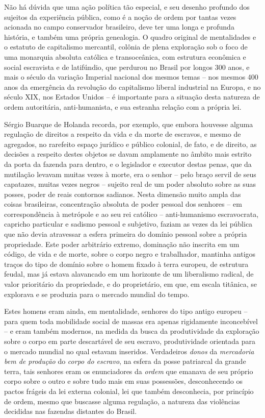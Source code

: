 Não há dúvida que uma ação política tão especial, e seu desenho profundo
dos sujeitos da experiência pública, como é a noção de ordem por tantas
vezes acionada no campo conservador brasileiro, deve ter uma longa e
profunda história, e também uma própria genealogia. O quadro original de
mentalidades e o estatuto de capitalismo mercantil, colônia de plena
exploração sob o foco de uma monarquia absoluta católica e
transoceânica, com estrutura econômica e social escravista e de
latifúndio, que perdurou no Brasil por longos 300 anos, e mais o século
da variação Imperial nacional dos mesmos temas -- nos mesmos 400 anos da
emergência da revolução do capitalismo liberal industrial na Europa, e
no século XIX, nos Estados Unidos -- é importante para a situação desta
natureza de ordem autoritária, anti-humanista, e sua estranha relação
com a própria lei.

Sérgio Buarque de Holanda recorda, por exemplo, que embora houvesse
alguma regulação de direitos a respeito da vida e da morte de escravos,
e mesmo de agregados, no rarefeito espaço jurídico e público colonial,
de fato, e de direito, as decisões a respeito destes objetos se davam
amplamente no âmbito mais estrito da porta da fazenda para dentro, e o
legislador e executor destas penas, que da mutilação levavam muitas
vezes à morte, era o senhor -- pelo braço servil de seus capatazes,
muitas vezes negros -- sujeito real de um poder absoluto sobre as suas
posses, poder de reais contornos sadianos. Nesta dimensão muito ampla
das coisas brasileiras, concentração absoluta de poder pessoal dos
senhores -- em correspondência à metrópole e ao seu rei católico --
anti-humanismo escravocrata, capricho particular e sadismo pessoal e
subjetivo, faziam as vezes da lei pública que não devia atravessar a
esfera primeira do domínio pessoal sobre a própria propriedade. Este
poder arbitrário extremo, dominação não inscrita em um código, de vida e
de morte, sobre o corpo negro e trabalhador, mantinha antigos traços do
tipo de domínio sobre o homem fixado à terra europeu, de estrutura
feudal, mas já estava alavancado em um horizonte de um liberalismo
radical, de valor prioritário da propriedade, e do proprietário, em que,
em escala titânica, se explorava e se produzia para o mercado mundial do
tempo.

Estes homens eram ainda, em mentalidade, senhores do tipo antigo europeu
-- para quem toda mobilidade social de massas era apenas rigidamente
inconcebível -- e eram também modernos, na medida da busca da
produtividade da exploração sobre o corpo em parte descartável de seu
escravo, produtividade orientada para o mercado mundial no qual estavam
inseridos. Verdadeiros \emph{donos} da \emph{mercadoria bem de produção}
do \emph{corpo do escravo}, na esfera da posse patriarcal da grande
terra, tais senhores eram os enunciadores da \emph{ordem} que emanava de
seu próprio corpo sobre o outro e sobre tudo mais em suas possessões,
desconhecendo os pactos frágeis da lei externa colonial, lei que também
desconhecia, por princípio de ordem, mesmo que buscasse alguma
regulação, a natureza das violências decididas nas fazendas distantes do
Brasil.

